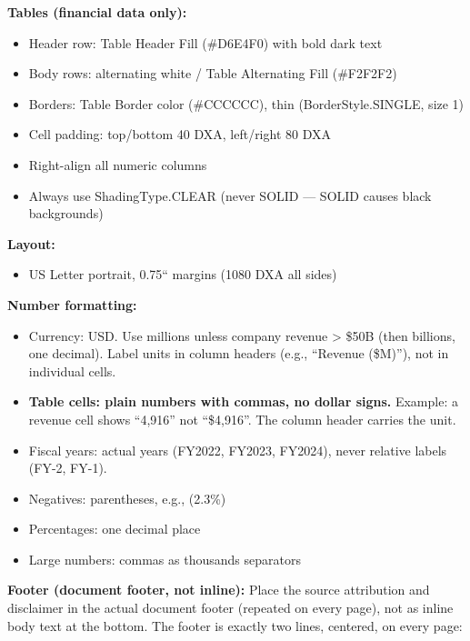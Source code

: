 \documentclass[11pt]{article}
\begin{document}
\textbf{Tables (financial data only):}

\begin{itemize}[leftmargin=*,itemsep=2pt,topsep=2pt]
\item {} Header row: Table Header Fill (\#D6E4F0) with bold dark text
\item {} Body rows: alternating white / Table Alternating Fill (\#F2F2F2)
\item {} Borders: Table Border color (\#CCCCCC), thin (BorderStyle.SINGLE, size 1)
\item {} Cell padding: top/bottom 40 DXA, left/right 80 DXA
\item {} Right-align all numeric columns
\item {} Always use ShadingType.CLEAR (never SOLID — SOLID causes black backgrounds)
\end{itemize}

\textbf{Layout:}

\begin{itemize}[leftmargin=*,itemsep=2pt,topsep=2pt]
\item {} US Letter portrait, 0.75`` margins (1080 DXA all sides)
\end{itemize}

\textbf{Number formatting:}

\begin{itemize}[leftmargin=*,itemsep=2pt,topsep=2pt]
\item {} Currency: USD. Use millions unless company revenue > \$50B (then billions, one decimal). Label units in column headers (e.g., ``Revenue (\$M)''), not in individual cells.
\item {} \textbf{Table cells: plain numbers with commas, no dollar signs.} Example: a revenue cell shows ``4,916'' not ``\$4,916''. The column header carries the unit.
\item {} Fiscal years: actual years (FY2022, FY2023, FY2024), never relative labels (FY-2, FY-1).
\item {} Negatives: parentheses, e.g., (2.3\%)
\item {} Percentages: one decimal place
\item {} Large numbers: commas as thousands separators
\end{itemize}

\textbf{Footer (document footer, not inline):} Place the source attribution and disclaimer in the actual document footer (repeated on every page), not as inline body text at the bottom. The footer is exactly two lines, centered, on every page:
\end{document}
